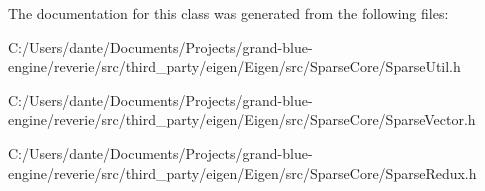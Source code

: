 The documentation for this class was generated from the following files\+:\begin{DoxyCompactItemize}
\item 
C\+:/\+Users/dante/\+Documents/\+Projects/grand-\/blue-\/engine/reverie/src/third\+\_\+party/eigen/\+Eigen/src/\+Sparse\+Core/Sparse\+Util.\+h\item 
C\+:/\+Users/dante/\+Documents/\+Projects/grand-\/blue-\/engine/reverie/src/third\+\_\+party/eigen/\+Eigen/src/\+Sparse\+Core/Sparse\+Vector.\+h\item 
C\+:/\+Users/dante/\+Documents/\+Projects/grand-\/blue-\/engine/reverie/src/third\+\_\+party/eigen/\+Eigen/src/\+Sparse\+Core/Sparse\+Redux.\+h\end{DoxyCompactItemize}
